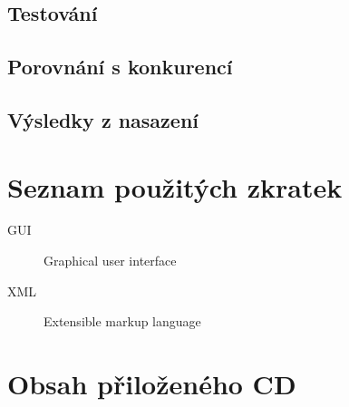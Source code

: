 \documentclass[thesis=B,czech,hidelinks]{FITthesis}[2019/03/06]
\begin{document}
\section{Testování}
\section{Porovnání s konkurencí}
\section{Výsledky z nasazení}

\begin{conclusion}
\end{conclusion}

\printbibliography{}

\appendix

\chapter{Seznam použitých zkratek}
\begin{description}
    \item[GUI] Graphical user interface
    \item[XML] Extensible markup language
\end{description}

\chapter{Obsah přiloženého CD}

\end{document}
